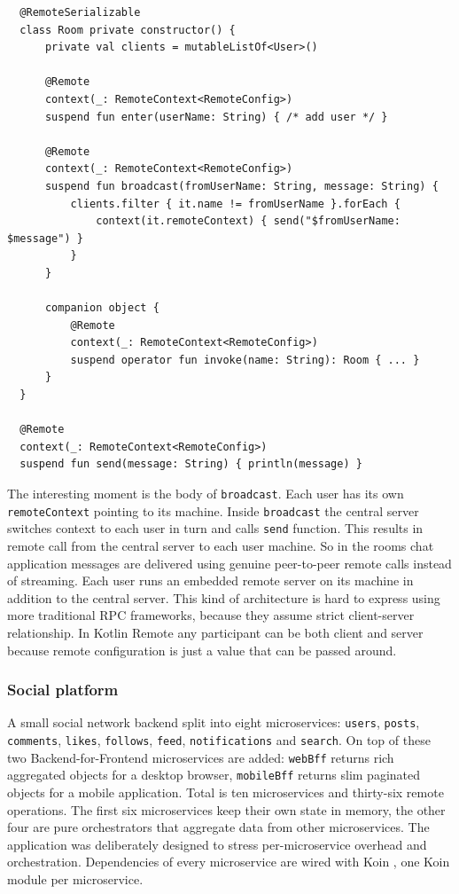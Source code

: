 \documentclass[a4paper,11pt,oneside]{article}
\newcommand{\kotlini}[1]{\texttt{#1}}
\begin{document}
\begin{listing}[!h]
  \begin{verbatim}
  @RemoteSerializable
  class Room private constructor() {
      private val clients = mutableListOf<User>()

      @Remote
      context(_: RemoteContext<RemoteConfig>)
      suspend fun enter(userName: String) { /* add user */ }

      @Remote
      context(_: RemoteContext<RemoteConfig>)
      suspend fun broadcast(fromUserName: String, message: String) {
          clients.filter { it.name != fromUserName }.forEach {
              context(it.remoteContext) { send("$fromUserName: $message") }
          }
      }

      companion object {
          @Remote
          context(_: RemoteContext<RemoteConfig>)
          suspend operator fun invoke(name: String): Room { ... }
      }
  }

  @Remote
  context(_: RemoteContext<RemoteConfig>)
  suspend fun send(message: String) { println(message) }
  \end{verbatim}
  \caption{Rooms chat: \kotlini{Room} class and \kotlini{send} function}\label{room_class}
\end{listing}

The interesting moment is the body of \kotlini{broadcast}. Each user has its own
\kotlini{remoteContext} pointing to its machine. Inside \kotlini{broadcast} the central server
switches context to each user in turn and calls \kotlini{send} function. This results in remote
call from the central server to each user machine. So in the rooms chat application messages are
delivered using genuine peer-to-peer remote calls instead of streaming. Each user runs an embedded
remote server on its machine in addition to the central server. This kind of architecture is hard
to express using more traditional RPC frameworks, because they assume strict client-server
relationship. In Kotlin Remote any participant can be both client and server because remote
configuration is just a value that can be passed around.

\subsubsection{Social platform} \label{social_app_section}

A small social network backend split into eight microservices: \kotlini{users}, \kotlini{posts},
\kotlini{comments}, \kotlini{likes}, \kotlini{follows}, \kotlini{feed},
\kotlini{notifications} and \kotlini{search}. On top of these two Backend-for-Frontend
microservices are added: \kotlini{webBff} returns rich aggregated objects for a desktop browser,
\kotlini{mobileBff} returns slim paginated objects for a mobile application. Total is ten
microservices and thirty-six remote operations. The first six microservices keep their own state
in memory, the other four are pure orchestrators that aggregate data from other microservices.
The application was deliberately designed to stress per-microservice overhead and orchestration.
Dependencies of every microservice are wired with Koin \cite{noauthor_koin_nodate}, one Koin
module per microservice.
\end{document}

